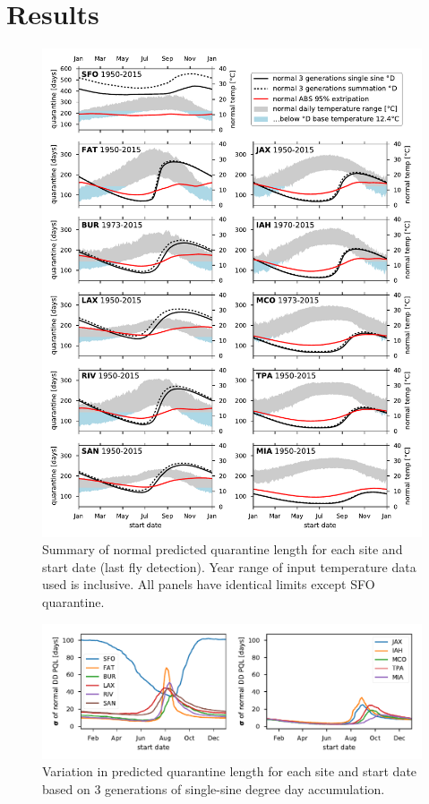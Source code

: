 \documentclass[10pt,a4paper,twocolumn]{article}
\begin{document}
\section*{Results}

\begin{figure}[htp!] %
\centering
\includegraphics{figs/fig_main.pdf}
\caption{\label{fig:main_summary}Summary of normal predicted quarantine length 
for each site and start date (last fly detection).
Year range of input temperature data used is inclusive.
All panels have identical limits except SFO quarantine.}
\end{figure}

\begin{figure}[ht!]
\centering
\includegraphics{figs/fig_BMDD_variation.pdf}
\caption{\label{fig:DD_variation_summary}Variation in predicted quarantine length
for each site and start date
based on 3 generations of single-sine degree day accumulation.}
\end{figure}
\end{document}
